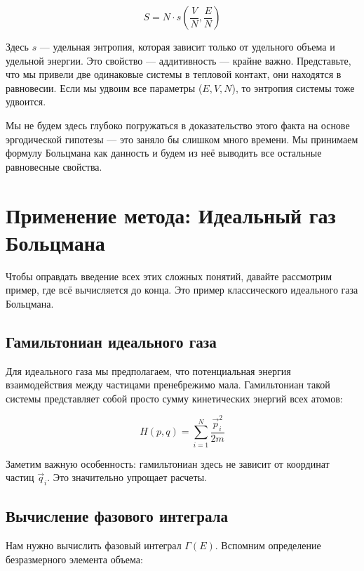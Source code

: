 \documentclass[../general/general]{subfiles}
\begin{document}
\begin{equation}
    S = N \cdot s\left(\frac{V}{N}, \frac{E}{N}\right)
\end{equation}

Здесь $s$ — удельная энтропия, которая зависит только от удельного объема и удельной энергии. Это свойство — аддитивность — крайне важно. Представьте, что мы привели две одинаковые системы в тепловой контакт, они находятся в равновесии. Если мы удвоим все параметры ($E, V, N$), то энтропия системы тоже удвоится.

Мы не будем здесь глубоко погружаться в доказательство этого факта на основе эргодической гипотезы — это заняло бы слишком много времени. Мы принимаем формулу Больцмана как данность и будем из неё выводить все остальные равновесные свойства.

\section{Применение метода: Идеальный газ Больцмана}

Чтобы оправдать введение всех этих сложных понятий, давайте рассмотрим пример, где всё вычисляется до конца. Это пример классического идеального газа Больцмана.

\subsection{Гамильтониан идеального газа}

Для идеального газа мы предполагаем, что потенциальная энергия взаимодействия между частицами пренебрежимо мала. Гамильтониан такой системы представляет собой просто сумму кинетических энергий всех атомов:

\begin{equation}
    H(p, q) = \sum_{i=1}^N \frac{\vec{p}_i^2}{2m}
\end{equation}

Заметим важную особенность: гамильтониан здесь не зависит от координат частиц $\vec{q}_i$. Это значительно упрощает расчеты.

\subsection{Вычисление фазового интеграла}

Нам нужно вычислить фазовый интеграл $\Gamma(E)$. Вспомним определение безразмерного элемента объема:
\end{document}
